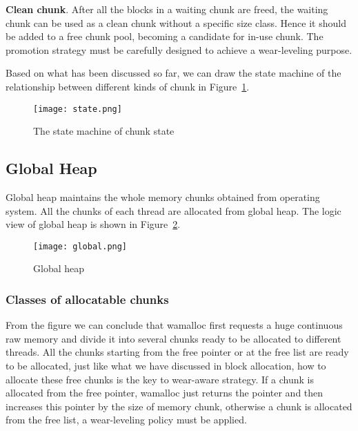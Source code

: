 \documentclass{vldb}
\begin{document}
\textbf{Clean chunk}.
After all the blocks in a waiting chunk are freed, the waiting chunk can be used as a clean chunk without a specific size class.
Hence it should be added to a free chunk pool, becoming a candidate for in-use chunk.
The promotion strategy must be carefully designed to achieve a wear-leveling purpose.

Based on what has been discussed so far,
we can draw the state machine of the relationship between different kinds of chunk in Figure~\ref{fig:state}.

\begin{figure}[h]
\centering
\texttt{[image: state.png]}
\caption{The state machine of chunk state}
\label{fig:state}
\end{figure}

\subsection{Global Heap}

Global heap maintains the whole memory chunks obtained from operating system. 
All the chunks of each thread are allocated from global heap. 
The logic view of global heap is shown in Figure~\ref{fig:global}.

\begin{figure}[h]
\centering
\texttt{[image: global.png]}
\caption{Global heap }
\label{fig:global}
\end{figure}

\subsubsection{Classes of allocatable chunks}
From the figure we can conclude that wamalloc first requests a huge continuous raw memory and divide it into several chunks ready to be allocated to different threads.
All the chunks starting from the free pointer or at the free list are ready to be allocated, 
just like what we have discussed in block allocation, how to allocate these free chunks is the key to wear-aware strategy.
If a chunk is allocated from the free pointer, wamalloc just returns the pointer and then increases this pointer by the size of memory chunk, 
otherwise a chunk is allocated from the free list, a wear-leveling policy must be applied.
\end{document}
